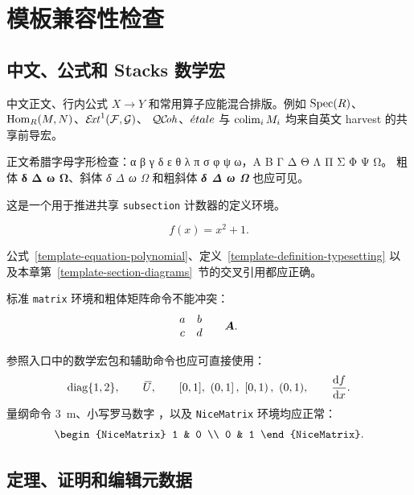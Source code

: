 \chapter{模板兼容性检查}
\label{template-chapter-check}

\section{中文、公式和 Stacks 数学宏}
\label{template-section-macros}

中文正文、行内公式 $X \longrightarrow Y$ 和常用算子应能混合排版。例如
$\mathop{\mathrm{Spec}}(R)$、$\mathop{\mathrm{Hom}}\nolimits_R(M,N)$、$\mathop{\mathcal{E}\!\mathit{xt}}\nolimits^1(\mathcal F,\mathcal G)$、
$\mathcal{QC}\!\mathit{oh}$、${\acute{e}tale}$ 与 $\mathop{\mathrm{colim}}\nolimits_i M_i$ 均来自英文 harvest 的共享前导宏。

正文希腊字母字形检查：α β γ δ ε θ λ π σ φ ψ ω，Α Β Γ Δ Θ Λ Π Σ Φ Ψ Ω。
粗体 \textbf{δ Δ ω Ω}、斜体 \textit{δ Δ ω Ω} 和粗斜体
{\bfseries\itshape δ Δ ω Ω} 也应可见。

\begin{definition}[排版测试]
\label{template-definition-typesetting}
这是一个用于推进共享 \texttt{subsection} 计数器的定义环境。
\end{definition}

\begin{equation}
\label{template-equation-polynomial}
  f(x)=x^2+1.
\end{equation}

公式~\ref{template-equation-polynomial}、定义~\ref{template-definition-typesetting}
以及本章第~\ref{template-section-diagrams}~节的交叉引用都应正确。

标准 \texttt{matrix} 环境和粗体矩阵命令不能冲突：
\[
  \begin{matrix}
    a & b \\
    c & d
  \end{matrix}
  \qquad \boldsymbol{A}.
\]

参照入口中的数学宏包和辅助命令也应可直接使用：
\[
  \mathrm{diag}\qty{1,2},\qquad
  {}\mkern3mu\overline{\mkern-3muU},\qquad
  \qty[0,1],\ \left(0,1\right],\ \left[0,1\right),\ \qty(0,1),\qquad
  \dv{f}{x}.
\]
量纲命令 \SI{3}{\metre}、小写罗马数字 ，以及
\texttt{NiceMatrix} 环境均应正常：
\[
  \begin{NiceMatrix}
    1 & 0 \\
    0 & 1
  \end{NiceMatrix}.
\]

\section{定理、证明和编辑元数据}
\label{template-section-theorems}

